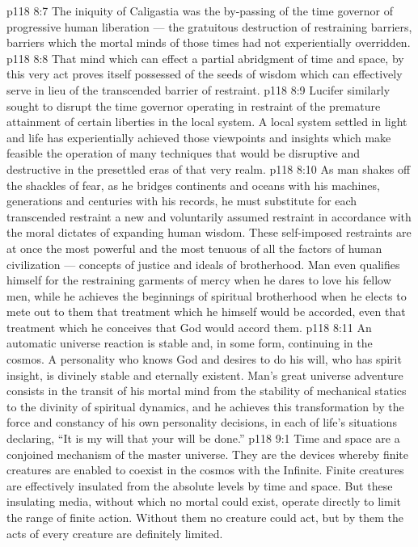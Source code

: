\vs p118 8:7 The iniquity of Caligastia was the by\hyp{}passing of the time governor of progressive human liberation --- the gratuitous destruction of restraining barriers, barriers which the mortal minds of those times had not experientially overridden.
\vs p118 8:8 That mind which can effect a partial abridgment of time and space, by this very act proves itself possessed of the seeds of wisdom which can effectively serve in lieu of the transcended barrier of restraint.
\vs p118 8:9 Lucifer similarly sought to disrupt the time governor operating in restraint of the premature attainment of certain liberties in the local system. A local system settled in light and life has experientially achieved those viewpoints and insights which make feasible the operation of many techniques that would be disruptive and destructive in the presettled eras of that very realm.
\vs p118 8:10 As man shakes off the shackles of fear, as he bridges continents and oceans with his machines, generations and centuries with his records, he must substitute for each transcended restraint a new and voluntarily assumed restraint in accordance with the moral dictates of expanding human wisdom. These self\hyp{}imposed restraints are at once the most powerful and the most tenuous of all the factors of human civilization --- concepts of justice and ideals of brotherhood. Man even qualifies himself for the restraining garments of mercy when he dares to love his fellow men, while he achieves the beginnings of spiritual brotherhood when he elects to mete out to them that treatment which he himself would be accorded, even that treatment which he conceives that God would accord them.
\vs p118 8:11 An automatic universe reaction is stable and, in some form, continuing in the cosmos. A personality who knows God and desires to do his will, who has spirit insight, is divinely stable and eternally existent. Man’s great universe adventure consists in the transit of his mortal mind from the stability of mechanical statics to the divinity of spiritual dynamics, and he achieves this transformation by the force and constancy of his own personality decisions, in each of life’s situations declaring, “It is my will that your will be done.”
\vs p118 9:1 Time and space are a conjoined mechanism of the master universe. They are the devices whereby finite creatures are enabled to coexist in the cosmos with the Infinite. Finite creatures are effectively insulated from the absolute levels by time and space. But these insulating media, without which no mortal could exist, operate directly to limit the range of finite action. Without them no creature could act, but by them the acts of every creature are definitely limited.
